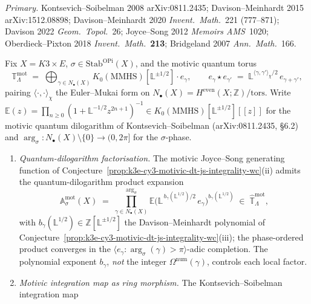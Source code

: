 \begin{remark}
\emph{Primary.}
Kontsevich--Soibelman 2008 arXiv:0811.2435;
Davison--Meinhardt 2015 arXiv:1512.08898;
Davison--Meinhardt 2020 \emph{Invent.\ Math.}\ 221 (777--871);
Davison 2022 \emph{Geom.\ Topol.}\ 26;
Joyce--Song 2012 \emph{Memoirs AMS}\ 1020;
Oberdieck--Pixton 2018 \emph{Invent.\ Math.}\ \textbf{213};
Bridgeland 2007 \emph{Ann.\ Math.}\ 166.
\end{remark}

\begin{conjecture}
\label{prop:k3e-cy3-motivic-qdilog-wc-gl2}
\ClaimStatusConjectured
Fix $X = K3 \times E$, $\sigma \in \mathrm{Stab}^{\mathrm{OPi}}(X)$, and the motivic quantum torus
\[
\mathbb T_\Lambda^{\mathrm{mot}} \;=\; \bigoplus_{\gamma \in N_\bullet(X)} K_0(\mathrm{MMHS})[\mathbb L^{\pm 1/2}] \cdot e_\gamma,
\qquad
e_\gamma \star e_{\gamma'} \;=\; \mathbb L^{\langle \gamma, \gamma' \rangle_\chi / 2} \, e_{\gamma + \gamma'},
\]
pairing $\langle \cdot, \cdot \rangle_\chi$ the Euler--Mukai form on $N_\bullet(X) = H^{\mathrm{even}}(X; \mathbb Z)/\mathrm{tors}$. Write $\mathbb E(z) = \prod_{n \geq 0} (1 + \mathbb L^{-1/2} z^{2n+1})^{-1} \in K_0(\mathrm{MMHS})[\mathbb L^{\pm 1/2}][\![ z ]\!]$ for the motivic quantum dilogarithm of Kontsevich--Soibelman (arXiv:0811.2435, \S 6.2) and $\arg_\sigma \colon N_\bullet(X) \setminus \{0\} \to (0, 2\pi]$ for the $\sigma$-phase.
\begin{enumerate}[label=\textup{(\roman*)},leftmargin=1.5em]
\item \emph{Quantum-dilogarithm factorisation.} The motivic Joyce--Song generating function of Conjecture~\ref{prop:k3e-cy3-motivic-dt-js-integrality-wc}(ii) admits the quantum-dilogarithm product expansion
\[
 \mathbb A_\sigma^{\mathrm{mot}}(X) \;=\; \prod_{\gamma \in N_\bullet(X)}^{\arg_\sigma} \mathbb E\bigl( \mathbb L^{\,b_\gamma(\mathbb L^{1/2}) / 2} \, e_\gamma \bigr)^{b_\gamma(\mathbb L^{1/2})}
 \;\in\; \widehat{\mathbb T}_\Lambda^{\mathrm{mot}},
\]
with $b_\gamma(\mathbb L^{1/2}) \in \mathbb Z[\mathbb L^{\pm 1/2}]$ the Davison--Meinhardt polynomial of Conjecture~\ref{prop:k3e-cy3-motivic-dt-js-integrality-wc}(iii); the phase-ordered product converges in the $\langle e_\gamma : \arg_\sigma(\gamma) > \pi \rangle$-adic completion. The polynomial exponent $b_\gamma$, \emph{not} the integer $\Omega^{\mathrm{num}}(\gamma)$, controls each local factor.
\item \emph{Motivic integration map as ring morphism.} The Kontsevich--Soibelman integration map

\end{enumerate}
\end{conjecture}
